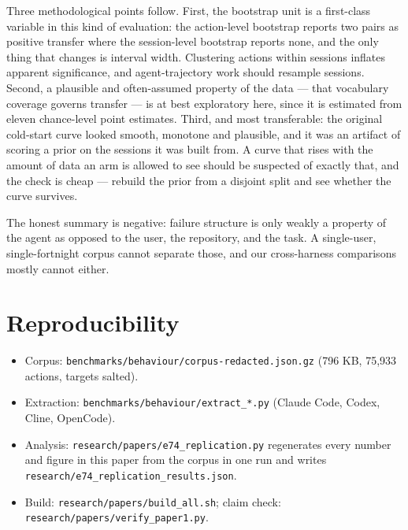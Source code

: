 \documentclass[11pt]{article}
\begin{document}
Three methodological points follow. First, the bootstrap unit is a
first-class variable in this kind of evaluation: the action-level bootstrap
reports two pairs as positive transfer where the session-level bootstrap
reports none, and the only thing that changes is interval width. Clustering
actions within sessions inflates apparent significance, and
agent-trajectory work should resample sessions. Second, a plausible and
often-assumed property of the data --- that vocabulary coverage governs
transfer --- is at best exploratory here, since it is estimated from
eleven chance-level point estimates. Third, and most transferable: the
original cold-start curve looked smooth, monotone and plausible, and it was
an artifact of scoring a prior on the sessions it was built from. A curve
that rises with the amount of data an arm is allowed to see should be
suspected of exactly that, and the check is cheap --- rebuild the prior from
a disjoint split and see whether the curve survives.

The honest summary is negative: failure structure is only weakly a
property of the agent as opposed to the user, the repository, and the task.
A single-user, single-fortnight corpus cannot separate those, and our
cross-harness comparisons mostly cannot either.

\section*{Reproducibility}

\begin{itemize}
\item Corpus: \texttt{benchmarks/behaviour/corpus-redacted.json.gz}
  (796 KB, 75,933 actions, targets salted).
\item Extraction: \texttt{benchmarks/behaviour/extract\_*.py}
  (Claude Code, Codex, Cline, OpenCode).
\item Analysis: \texttt{research/papers/e74\_replication.py} regenerates
  every number and figure in this paper from the corpus in one run and
  writes \texttt{research/e74\_replication\_results.json}.
\item Build: \texttt{research/papers/build\_all.sh}; claim check:
  \texttt{research/papers/verify\_paper1.py}.
\end{itemize}
\end{document}
